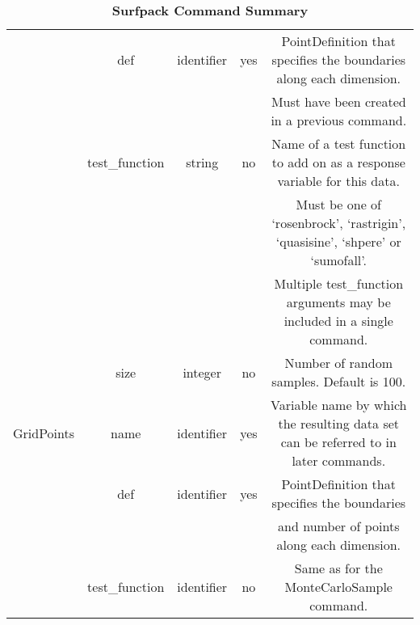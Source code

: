 \documentclass{article}
\begin{document}
\begin{sidewaystable}[h]
\begin{tabular}{|c|c|c|c|c|}
    \hline
    & def & identifier & yes & PointDefinition that specifies the
    boundaries along each dimension.\\
    & & & & Must have been created in a previous command.\\
    \hline
    & test\_function & string & no & Name of a test function to add on
    as a response variable for this data.\\
    & & & & Must be one of `rosenbrock', `rastrigin', `quasisine',
    `shpere' or `sumofall'.\\
    & & & & Multiple test\_function arguments may be included in a
    single command.\\
    \hline
    & size & integer & no & Number of random samples.  Default is
    100.\\
    \hline
    GridPoints & name & identifier & yes & Variable name by which the
    resulting data set can be referred to in later commands.\\
    \hline
    & def & identifier & yes & PointDefinition that specifies the
    boundaries\\
    & & & & and number of points along each dimension.\\
    \hline
    & test\_function & identifier & no & Same as for the
    MonteCarloSample command.\\
    \hline
  \end{tabular}
  \caption{\textbf{Surfpack Command Summary}}
\end{sidewaystable}
\end{document}
